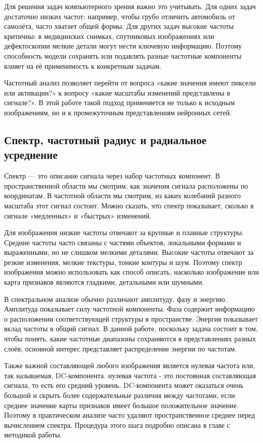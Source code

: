 Для решения задач компьютерного зрения важно это учитывать. Для одних задач достаточно низких частот: например, чтобы грубо отличить автомобиль от самолёта, часто хватает общей формы. Для других задач высокие частоты критичны: в медицинских снимках, спутниковых изображениях или дефектоскопии мелкие детали могут нести ключевую информацию. Поэтому способность модели сохранять или подавлять разные частотные компоненты влияет на её применимость к конкретным задачам.

Частотный анализ позволяет перейти от вопроса «какие значения имеют пиксели или активации?» к вопросу «какие масштабы изменений представлены в сигнале?». В этой работе такой подход применяется не только к исходным изображениям, но и к промежуточным представлениям нейронных сетей.

\subsection{Спектр, частотный радиус и радиальное усреднение}

Спектр — это описание сигнала через набор частотных компонент. В пространственной области мы смотрим, как значения сигнала расположены по координатам. В частотной области мы смотрим, из каких колебаний разного масштаба этот сигнал состоит. Можно сказать, что спектр показывает, сколько в сигнале «медленных» и «быстрых» изменений.

Для изображения низкие частоты отвечают за крупные и плавные структуры. Средние частоты часто связаны с частями объектов, локальными формами и выраженными, но не слишком мелкими деталями. Высокие частоты отвечают за резкие изменения, мелкие текстуры, тонкие контуры и шум. Поэтому спектр изображения можно использовать как способ описать, насколько изображение или карта признаков являются гладкими, детальными или шумными.

В спектральном анализе обычно различают амплитуду, фазу и энергию. Амплитуда показывает силу частотной компоненты. Фаза содержит информацию о расположении соответствующей структуры в пространстве. Энергия показывает вклад частоты в общий сигнал. В данной работе, поскольку задача состоит в том, чтобы понять, какие частотные диапазоны сохраняются в представлениях разных слоёв, основной интерес представляет распределение энергии по частотам.

Также важной составляющей любого изображения является нулевая частота или, так называемая, DC-компонента. нулевая частота -  это постоянная составляющая сигнала, то есть его средний уровень. DC-компонента может оказаться очень большой и скрыть более содержательные различия между частотами, если среднее значение карты признаков имеет большое положительное значение. Поэтому в практическом анализе часто удаляют пространственное среднее перед вычислением спектра. Процедура этого шага подробно описана в главе с методикой работы.

